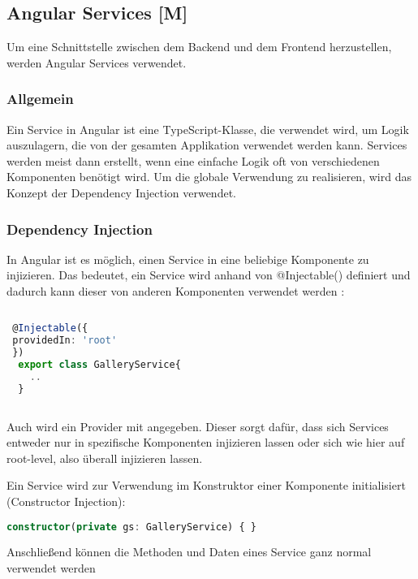 \subsection{Angular Services [M]}

Um eine Schnittstelle zwischen dem Backend und dem Frontend herzustellen, werden Angular Services verwendet.

\subsubsection{Allgemein}
Ein Service in Angular ist eine TypeScript-Klasse, die verwendet wird, um Logik auszulagern, die von der gesamten Applikation verwendet werden kann. Services werden meist dann erstellt, wenn eine einfache Logik oft von verschiedenen Komponenten benötigt wird. Um die globale Verwendung zu realisieren, wird das Konzept der Dependency Injection verwendet. \cite{AngularBuch} \cite{AngularArchitectureService}

\subsubsection{Dependency Injection}
\label{DPI}
In Angular ist es möglich, einen Service in eine beliebige Komponente zu injizieren. Das bedeutet, ein Service wird anhand von @Injectable() definiert und dadurch kann dieser von anderen Komponenten verwendet werden \cite{AngularBuch}:

\begin{lstlisting}[caption={Eine Klasse Injectable machen},  language=TypeScript,label=lst:impl:injectable]   
    
 @Injectable({
 providedIn: 'root'
 })
  export class GalleryService{
    ..
  }
   
\end{lstlisting}

Auch wird ein Provider mit angegeben. Dieser sorgt dafür, dass sich Services entweder nur in spezifische Komponenten injizieren lassen oder sich wie hier auf root-level, also überall injizieren lassen. \cite{AngularBuch}

Ein Service wird zur Verwendung im Konstruktor einer Komponente initialisiert (Constructor Injection): 

\begin{lstlisting}[caption={Constructor Injection},  language=TypeScript,label=lst:impl:concstructorinjection]   
    constructor(private gs: GalleryService) { }
\end{lstlisting}
Anschließend können die Methoden und Daten eines Service ganz normal verwendet werden

